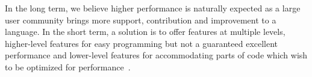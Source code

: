 
In the long term, we believe higher performance is naturally expected as a large user community brings more support, contribution and improvement to a language.
In the short term, a solution is to offer features at multiple levels, higher-level features for easy programming but not a guaranteed excellent performance and lower-level features for accommodating parts of code which wish to be optimized for performance~\cite{chapel}.
 